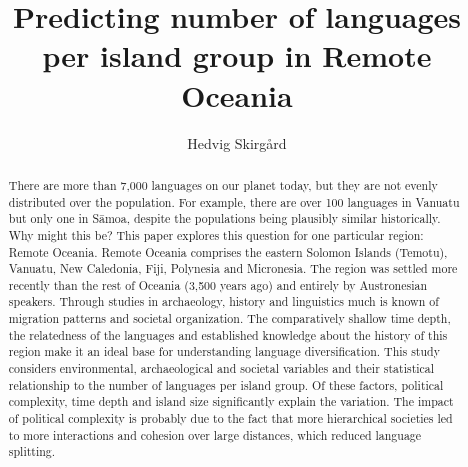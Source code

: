 \documentclass[a4paper,10pt]{article} %
\title{Predicting number of languages per island group in Remote Oceania}
\author{Hedvig Skirg{\aa}rd}
\affil{Department of Linguistic and Cultural Evolution,\linebreak Max Planck Institute for Evolutionary Anthropology.\linebreak Deutscher Platz 6, 04103 Leipzig. \linebreak Hedvig{\_}skirgard$@$eva.mpg.de
}
\begin{document}
\def\code#1{\texttt{#1}}

\thispagestyle{empty}

\maketitle
\thispagestyle{empty}



\begin{abstract}
\doublespacing
\normalsize
There are more than 7,000 languages on our planet today, but they are not evenly distributed over the population. For example, there are over 100 languages in Vanuatu but only one in S\={a}moa, despite the populations being plausibly similar historically. Why might this be? This paper explores this question for one particular region: Remote Oceania.
Remote Oceania comprises the eastern Solomon Islands (Temotu), Vanuatu, New Caledonia, Fiji, Polynesia and Micronesia. The region was settled more recently than the rest of Oceania (3,500 years ago) and entirely by Austronesian speakers. Through studies in archaeology, history and linguistics much is known of migration patterns and societal organization. The comparatively shallow time depth, the relatedness of the languages and established knowledge about the history of this region make it an ideal base for understanding language diversification. This study considers environmental, archaeological and societal variables and their statistical relationship to the number of languages per island group. Of these factors, political complexity, time depth and island size significantly explain the variation. The impact of political complexity is probably due to the fact that more hierarchical societies led to more interactions and cohesion over large distances, which reduced language splitting.



\end{abstract}

\newpage



\newpage
\singlespacing
\tableofcontents

\newpage
\listoffigures
 \listoftables
 \vspace{0.7cm}
\end{document}
